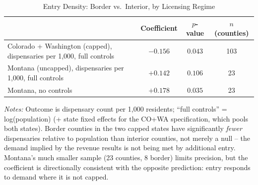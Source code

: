 \begin{table}[htbp]
\centering
\caption{Entry Density: Border vs.\ Interior, by Licensing Regime}
\label{tab:entry_density_mechanism}
\small
\begin{tabular}{p{6.4cm}ccc}
\toprule
& Coefficient & $p$-value & $n$ (counties) \\
\midrule
Colorado + Washington (capped), dispensaries per 1,000, full controls & $-0.156$ & $0.043$ & 103 \\
Montana (uncapped), dispensaries per 1,000, full controls & $+0.142$ & $0.106$ & 23 \\
\quad Montana, no controls & $+0.178$ & $0.035$ & 23 \\
\bottomrule
\end{tabular}
\begin{minipage}{0.95\textwidth}
\vspace{0.3em}
\footnotesize
\textit{Notes:} Outcome is dispensary count per 1,000 residents; ``full controls'' = log(population)
(+ state fixed effects for the CO+WA specification, which pools both states). Border counties in the two
capped states have significantly \emph{fewer} dispensaries relative to population than interior counties,
not merely a null -- the demand implied by the revenue results is not being met by additional entry.
Montana's much smaller sample (23 counties, 8 border) limits precision, but the coefficient is
directionally consistent with the opposite prediction: entry responds to demand where it is not capped.
\end{minipage}
\end{table}
